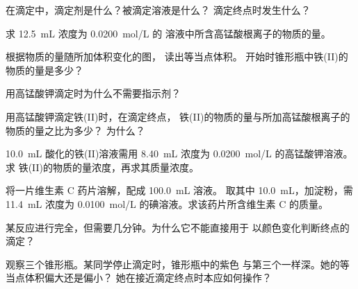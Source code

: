 \begin{exercise}[$\star$]\label{exo:g11:titration:1}
在滴定中，滴定剂是什么？被滴定溶液是什么？
滴定终点时发生什么？
\end{exercise}

\begin{exercise}[$\star$]\label{exo:g11:titration:2}
求 \qty{12.5}{mL} 浓度为 \qty{0.0200}{mol/L} 的
溶液中所含高锰酸根离子的物质的量。
\end{exercise}

\begin{exercise}[$\star$]\label{exo:g11:titration:3}
根据物质的量随所加体积变化的图，
读出等当点体积。
开始时锥形瓶中铁(II)的物质的量是多少？
\end{exercise}

\begin{exercise}[$\star$]\label{exo:g11:titration:4}
用高锰酸钾滴定时为什么不需要指示剂？
\end{exercise}

\begin{exercise}[$\star$]\label{exo:g11:titration:5}
用高锰酸钾滴定铁(II)时，在滴定终点，
铁(II)的物质的量与所加高锰酸根离子的物质的量之比为多少？
为什么？
\end{exercise}

\begin{exercise}[$\star\star$]\label{exo:g11:titration:6}
\qty{10.0}{mL} 酸化的铁(II)溶液需用 \qty{8.40}{mL}
浓度为 \qty{0.0200}{mol/L} 的高锰酸钾溶液。求
铁(II)的物质的量浓度，再求其质量浓度。
\end{exercise}

\begin{exercise}[$\star\star$]\label{exo:g11:titration:7}
将一片维生素 C 药片溶解，配成 \qty{100.0}{mL} 溶液。
取其中 \qty{10.0}{mL}，加淀粉，需 \qty{11.4}{mL} 浓度为
\qty{0.0100}{mol/L} 的碘溶液。求该药片所含维生素 C 的质量。
\end{exercise}

\begin{exercise}[$\star\star$]\label{exo:g11:titration:8}
某反应进行完全，但需要几分钟。为什么它不能直接用于
以颜色变化判断终点的滴定？
\end{exercise}

\begin{exercise}[$\star\star$]\label{exo:g11:titration:9}
观察三个锥形瓶。某同学停止滴定时，锥形瓶中的紫色
与第三个一样深。她的等当点体积偏大还是偏小？
她在接近滴定终点时本应如何操作？
\end{exercise}

